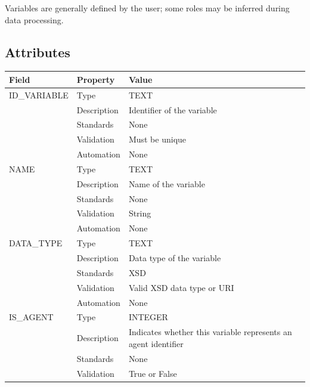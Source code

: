 Variables are generally defined by the user; some roles may be inferred
during data processing.

\subsection{Attributes}\label{attributes-34}

\begin{longtable}[]{@{}
  >{\raggedright\arraybackslash}p{}
  >{\raggedright\arraybackslash}p{}
  >{\raggedright\arraybackslash}p{}@{}}
\toprule\noalign{}
\begin{minipage}[b]{\linewidth}\raggedright
Field
\end{minipage} & \begin{minipage}[b]{\linewidth}\raggedright
Property
\end{minipage} & \begin{minipage}[b]{\linewidth}\raggedright
Value
\end{minipage} \\
\midrule\noalign{}
\endhead
\bottomrule\noalign{}
\endlastfoot
ID\_VARIABLE & Type & TEXT \\
& Description & Identifier of the variable \\
& Standards & None \\
& Validation & Must be unique \\
& Automation & None \\
NAME & Type & TEXT \\
& Description & Name of the variable \\
& Standards & None \\
& Validation & String \\
& Automation & None \\
DATA\_TYPE & Type & TEXT \\
& Description & Data type of the variable \\
& Standards & XSD \\
& Validation & Valid XSD data type or URI \\
& Automation & None \\
IS\_AGENT & Type & INTEGER \\
& Description & Indicates whether this variable represents an agent
identifier \\
& Standards & None \\
& Validation & True or False \\

\end{longtable}
